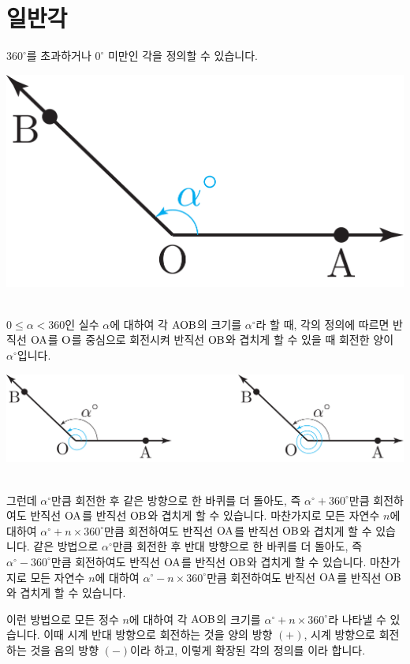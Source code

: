 \clearpage
{}
\section{일반각}
$360^\circ$를 초과하거나 $0^\circ$ 미만인 각을 정의할 수 있습니다.
\begin{center}
\includegraphics[scale=\pgfkeysvalueof{picsize}]{DBs/pic/zert_04.pdf}\
\end{center}$0 \le \alpha < 360$인 실수 $\alpha$에 대하여 각 $\mathrm{AOB}$의 크기를 $\alpha^\circ$라 할 때, 각의 정의에 따르면 반직선 $\mathrm{OA}$를 $\mathrm{O}$를 중심으로 회전시켜 반직선 $\mathrm{OB}$와 겹치게 할 수 있을 때 회전한 양이 $\alpha^\circ$입니다.
\begin{center}
\includegraphics[scale=\pgfkeysvalueof{picsize}]{DBs/pic/zert_05.pdf}\
\end{center}그런데 $\alpha^\circ$만큼 회전한 후 같은 방향으로 한 바퀴를 더 돌아도, 즉 $\alpha^\circ + 360^\circ$만큼 회전하여도 반직선 $\mathrm{OA}$를 반직선 $\mathrm{OB}$와 겹치게 할 수 있습니다. 마찬가지로 모든 자연수 $n$에 대하여 $\alpha^\circ + n\times 360^\circ$만큼 회전하여도 반직선 $\mathrm{OA}$를 반직선 $\mathrm{OB}$와 겹치게 할 수 있습니다. 같은 방법으로 $\alpha^\circ$만큼 회전한 후 반대 방향으로 한 바퀴를 더 돌아도, 즉 $\alpha^\circ - 360^\circ$만큼 회전하여도 반직선 $\mathrm{OA}$를 반직선 $\mathrm{OB}$와 겹치게 할 수 있습니다. 마찬가지로 모든 자연수 $n$에 대하여 $\alpha^\circ - n\times 360^\circ$만큼 회전하여도 반직선 $\mathrm{OA}$를 반직선 $\mathrm{OB}$와 겹치게 할 수 있습니다.

이런 방법으로 모든 정수 $n$에 대하여 각 $\mathrm{AOB}$의 크기를 $\alpha^\circ + n\times 360^\circ$라 나타낼 수 있습니다. 이때 시계 반대 방향으로 회전하는 것을 양의 방향 $(+)$, 시계 방향으로 회전하는 것을 음의 방향 $(-)$이라 하고, 이렇게 확장된 각의 정의를 \term{일반각}{}이라 합니다.

